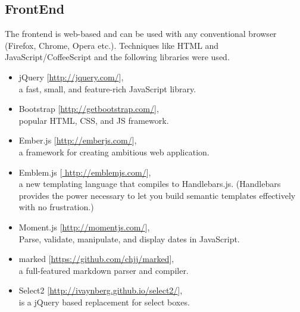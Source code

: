 \documentclass[12pt]{article}
\begin{document}
\subsection{FrontEnd}
\label{software_frontend}
The frontend is web-based and can be used with any conventional browser (Firefox, Chrome, Opera etc.). Techniques like HTML and JavaScript/CoffeeScript and the following libraries were used.
  \begin{itemize}
    \item jQuery [\url{http://jquery.com/}],\\a fast, small, and feature-rich JavaScript library.
    \item Bootstrap [\url{http://getbootstrap.com/}],\\popular HTML, CSS, and JS framework.
    \item Ember.js [\url{http://emberjs.com/}],\\a framework for creating ambitious web application.
    \item Emblem.js [\url{ http://emblemjs.com/}],\\a new templating language that compiles to Handlebars.js. (Handlebars provides the power necessary to let you build semantic templates effectively with no frustration.)
    \item Moment.js [\url{http://momentjs.com/}],\\Parse, validate, manipulate, and display dates in JavaScript.
    \item marked [\url{https://github.com/chjj/marked}],\\a full-featured markdown parser and compiler.
    \item Select2 [\url{http://ivaynberg.github.io/select2/}],\\is a jQuery based replacement for select boxes.
  \end{itemize}



\end{document}
